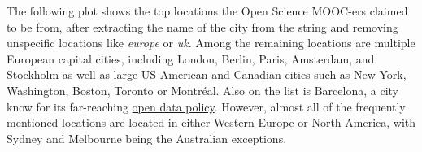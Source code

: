 \documentclass[]{article}
\newenvironment{Shaded}{\begin{snugshade}}{\end{snugshade}}
\newcommand{\KeywordTok}[1]{\textcolor[rgb]{0.13,0.29,0.53}{\textbf{#1}}}
\newcommand{\DataTypeTok}[1]{\textcolor[rgb]{0.13,0.29,0.53}{#1}}
\newcommand{\DecValTok}[1]{\textcolor[rgb]{0.00,0.00,0.81}{#1}}
\newcommand{\FloatTok}[1]{\textcolor[rgb]{0.00,0.00,0.81}{#1}}
\newcommand{\StringTok}[1]{\textcolor[rgb]{0.31,0.60,0.02}{#1}}
\newcommand{\CommentTok}[1]{\textcolor[rgb]{0.56,0.35,0.01}{\textit{#1}}}
\newcommand{\OtherTok}[1]{\textcolor[rgb]{0.56,0.35,0.01}{#1}}
\newcommand{\OperatorTok}[1]{\textcolor[rgb]{0.81,0.36,0.00}{\textbf{#1}}}
\newcommand{\NormalTok}[1]{#1}
\begin{document}
The following plot shows the top locations the Open Science MOOC-ers
claimed to be from, after extracting the name of the city from the
string and removing unspecific locations like \emph{europe} or
\emph{uk}. Among the remaining locations are multiple European capital
cities, including London, Berlin, Paris, Amsterdam, and Stockholm as
well as large US-American and Canadian cities such as New York,
Washington, Boston, Toronto or Montréal. Also on the list is Barcelona,
a city know for its far-reaching
\href{https://opendata-ajuntament.barcelona.cat/en/open-data-bcn}{open
data policy}. However, almost all of the frequently mentioned locations
are located in either Western Europe or North America, with Sydney and
Melbourne being the Australian exceptions.

\begin{Shaded}
\end{Shaded}
\end{document}

